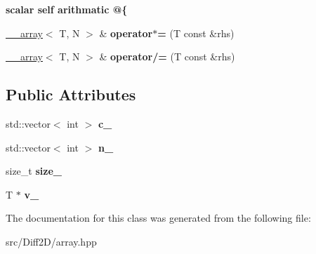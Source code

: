\begin{Indent}{\bf scalar self arithmatic @\{}\par
\begin{DoxyCompactItemize}
\item 
\hypertarget{class____array_abf242f49019b906d3f846fc185cc38ae}{\hyperlink{class____array}{\-\_\-\-\_\-array}$<$ T, N $>$ \& {\bfseries operator$\ast$=} (T const \&rhs)}\label{class____array_abf242f49019b906d3f846fc185cc38ae}

\item 
\hypertarget{class____array_ad0a349749a91dc7379c626dc13b6f26c}{\hyperlink{class____array}{\-\_\-\-\_\-array}$<$ T, N $>$ \& {\bfseries operator/=} (T const \&rhs)}\label{class____array_ad0a349749a91dc7379c626dc13b6f26c}

\end{DoxyCompactItemize}
\end{Indent}
\subsection*{Public Attributes}
\begin{DoxyCompactItemize}
\item 
\hypertarget{class____array_aaca68729c0b849ed2f2b5813d97406b4}{std\-::vector$<$ int $>$ {\bfseries c\-\_\-}}\label{class____array_aaca68729c0b849ed2f2b5813d97406b4}

\item 
\hypertarget{class____array_aa23a824622889b5edab8fcd74d9d2ca8}{std\-::vector$<$ int $>$ {\bfseries n\-\_\-}}\label{class____array_aa23a824622889b5edab8fcd74d9d2ca8}

\item 
\hypertarget{class____array_a9e84ea9904c281c73d38730bf1c63c6f}{size\-\_\-t {\bfseries size\-\_\-}}\label{class____array_a9e84ea9904c281c73d38730bf1c63c6f}

\item 
\hypertarget{class____array_acd1bdf7fd0d7c1d9888ec5ab746e4472}{T $\ast$ {\bfseries v\-\_\-}}\label{class____array_acd1bdf7fd0d7c1d9888ec5ab746e4472}

\end{DoxyCompactItemize}


The documentation for this class was generated from the following file\-:\begin{DoxyCompactItemize}
\item 
src/\-Diff2\-D/array.\-hpp\end{DoxyCompactItemize}
